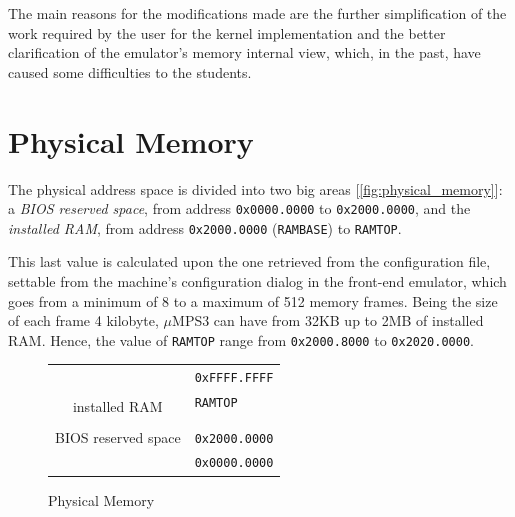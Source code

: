 \documentclass[12pt,a4paper,openright,twoside]{report}
\begin{document}
The main reasons for the modifications made are the further simplification of the work required by the user for the kernel implementation and the better clarification of the emulator's memory internal view, which, in the past, have caused some difficulties to the students.

\section{Physical Memory}
\label{chap:physical_memory}
The physical address space is divided into two big areas [\autoref{fig:physical_memory}]: a \textit{BIOS reserved space}, from address \texttt{0x0000.0000} to \texttt{0x2000.0000}, and the \textit{installed RAM}, from address \texttt{0x2000.0000} (\texttt{RAMBASE}) to \texttt{RAMTOP}.

This last value is calculated upon the one retrieved from the configuration file, settable from the machine's configuration dialog in the front-end emulator, which goes from a minimum of 8 to a maximum of 512 memory frames.
Being the size of each frame 4 kilobyte, $\mu$MPS3 can have from 32KB up to 2MB of installed RAM.
Hence, the value of \texttt{RAMTOP} range from \texttt{0x2000.8000} to \texttt{0x2020.0000}.

\begin{figure}[ht]
	\centering
	\renewcommand{\arraystretch}{0.8}
	\begin{tabular}{cl}
		                                                           & \multirow{2}{*}{\texttt{0xFFFF.FFFF}} \\ \cline{1-1}
		\multicolumn{1}{|c|}{\multirow{2}{*}{\cellcolor{gray}}}    &                                       \\ [-1ex]
		\multicolumn{1}{|c|}{\cellcolor{gray}}                     & \multirow{2}{*}{\texttt{RAMTOP}}      \\ \cline{1-1}
		\multicolumn{1}{|c|}{\multirow{4}{*}{installed RAM}}       &                                       \\
		\multicolumn{1}{|c|}{}                                     &                                       \\
		\multicolumn{1}{|c|}{}                                     &                                       \\
		\multicolumn{1}{|c|}{}                                     & \multirow{2}{*}{\texttt{0x2000.0000}} \\ \cline{1-1}
		\multicolumn{1}{|c|}{\multirow{2}{*}{BIOS reserved space}} &                                       \\
		\multicolumn{1}{|c|}{}                                     & \multirow{2}{*}{\texttt{0x0000.0000}} \\ \cline{1-1}
		\multicolumn{1}{l}{}                                       &
	\end{tabular}
	\caption{Physical Memory}
	\label{fig:physical_memory}
\end{figure}
\end{document}
